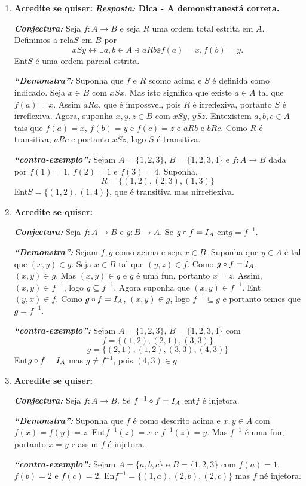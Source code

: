 \begin{enumerate}[{\bf 1.}]
\item {\bf Acredite se quiser:}  {\bf{\it Resposta:} Dica - A demonstra\cao n\ao est\'a correta.}

\noindent \textit{\textbf{Conjectura:}} Seja $f:A\to B$ e seja $R$ uma ordem total estrita em $A$. Definimos a rela\cao $S$ em $B$ por
\[
xSy \leftrightarrow \exists a,b\in A \ni aRb\ee f(a)=x,f(b)=y.
\]
Ent\ao $S$ \'e uma ordem parcial estrita.

\noindent \textit{\textbf{``Demonstra\caoi'':}} Suponha que $f$ e $ R$ s\ao como acima e $S$ \'e definida como indicado. Seja $x\in B$ com $xSx$. Mas isto significa que existe $a\in A$ tal que $f(a)=x$. Assim $aRa$, que \'e imposs\ih vel, pois $R$ \'e irreflexiva, portanto $S$ \'e irreflexiva. Agora, suponha $x,y,z\in B$ com $xSy$, $ySz$. Ent\ao existem $a,b,c\in A$ tais que $f(a)=x$, $f(b)=y$ e $f(c)=z$ e $aRb$ e $bRc$. Como $R$ \'e transitiva, $aRc$ e portanto $xSz$, logo $S$ \'e transitiva.

\noindent \textit{\textbf{``contra-exemplo'':}} Sejam $A=\{1,2,3\}$, $B=\{1,2,3,4\}$ e $f:A\to B$ dada por $f(1)=1$, $f(2)=1$ e $f(3)=4$. Suponha,
\[
R=\{(1,2),(2,3),(1,3)\}
\]
Ent\ao $S=\{(1,2),(1,4)\}$, que \'e transitiva mas n\ao irreflexiva.

\item {\bf Acredite se quiser:}  

\noindent \textit{\textbf{Conjectura:}} Seja $f:A\to B$ e $g:B\to A$. Se $g\circ f=I_A$ ent\ao $g=f^{-1}$.

\noindent \textit{\textbf{``Demonstra\caoi'':}} Sejam $f,g$ como acima e seja $x\in B$. Suponha que $y\in A$ \'e tal que $(x,y)\in g$. Seja $x\in B$ tal que $(y,z) \in f$. Como $g\circ f=I_A$, $(x,y)\in g$. Mas $(x,y)\in g$ e $g$ \'e uma fun\caoi, portanto $x=z$. Assim, $(x,y)\in f^{-1}$, logo $g\subseteq f^{-1}$. Agora suponha que $(x,y)\in f^{-1}$. Ent\ao $(y,x)\in f$. Como $g\circ f=I_A$, $(x,y)\in g$, logo $f^{-1}\subseteq g$ e portanto temos que $g=f^{-1}$.

\noindent \textit{\textbf{``contra-exemplo'':}} Sejam $A=\{1,2,3\}$, $B=\{1,2,3,4\}$ com
\[
f=\{(1,2),(2,1),(3,3)\}
\]
\[
g=\{(2,1),(1,2),(3,3),(4,3)\}
\]
Ent\ao $g\circ f=I_A$ mas $g\neq f^{-1}$, pois $(4,3)\in g$.

\item {\bf Acredite se quiser:}  

\noindent \textit{\textbf{Conjectura:}} Seja $f:A\to B$. Se $f^{-1}\circ f=I_A$ ent\ao $f$ \'e injetora.

\noindent \textit{\textbf{``Demonstra\caoi'':}} Suponha que $f$ \'e como descrito acima e $x,y\in A$ com $f(x)=f(y)=z$. Ent\ao $f^{-1}(z)=x$ e $f^{-1}(z)=y$. Mas $f^{-1}$ \'e uma fun\caoi, portanto $x=y$ e assim $f$ \'e injetora.

\noindent \textit{\textbf{``contra-exemplo'':}} Sejam $A=\{a,b,c\}$ e $B=\{1,2,3\}$ com $f(a)=1$, $f(b)=2$ e $f(c)=2$. En\tao $f^{-1}=\{(1,a),(2,b),(2,c)\}$ mas $f$ n\ao \'e injetora.
\end{enumerate}
